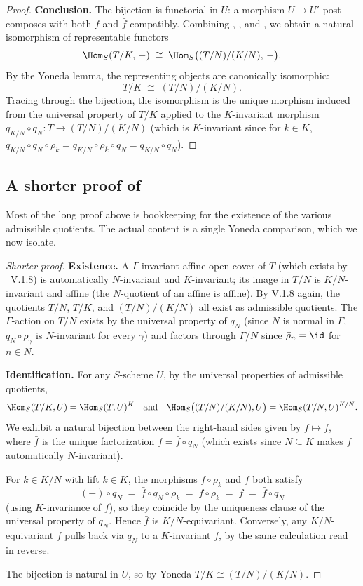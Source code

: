 \begin{proof}
\textbf{Conclusion.} The bijection  is functorial in $U$: a morphism $U \to U'$ post-composes with both $f$ and $\bar f$ compatibly. Combining , , and , we obtain a natural isomorphism of representable functors
\[
\Hom_S(T/K,\, -) \;\cong\; \Hom_S\bigl((T/N)/(K/N),\, -\bigr).
\]
By the Yoneda lemma, the representing objects are canonically isomorphic:
\[
T/K \;\cong\; (T/N)/(K/N).
\]
Tracing through the bijection, the isomorphism is the unique morphism induced from the universal property of $T/K$ applied to the $K$-invariant morphism $q_{K/N} \circ q_N : T \to (T/N)/(K/N)$ (which is $K$-invariant since for $k \in K$, $q_{K/N} \circ q_N \circ \rho_k = q_{K/N} \circ \bar\rho_{\bar k} \circ q_N = q_{K/N} \circ q_N$).
\end{proof}

\subsection*{A shorter proof of }

Most of the long proof above is bookkeeping for the existence of the various admissible quotients. The actual content is a single Yoneda comparison, which we now isolate.

\begin{proof}[Shorter proof]
\textbf{Existence.} A $\Gamma$-invariant affine open cover of $T$ (which exists by \cite{sga1}~V.1.8) is automatically $N$-invariant and $K$-invariant; its image in $T/N$ is $K/N$-invariant and affine (the $N$-quotient of an affine is affine). By V.1.8 again, the quotients $T/N$, $T/K$, and $(T/N)/(K/N)$ all exist as admissible quotients. The $\Gamma$-action on $T/N$ exists by the universal property of $q_N$ (since $N$ is normal in $\Gamma$, $q_N \circ \rho_\gamma$ is $N$-invariant for every $\gamma$) and factors through $\Gamma/N$ since $\bar\rho_n = \id$ for $n \in N$.

\textbf{Identification.} For any $S$-scheme $U$, by the universal properties of admissible quotients,
\[
\Hom_S(T/K,U) = \Hom_S(T,U)^K \quad\text{and}\quad \Hom_S\bigl((T/N)/(K/N),U\bigr) = \Hom_S(T/N,U)^{K/N}.
\]
We exhibit a natural bijection between the right-hand sides given by $f \mapsto \bar f$, where $\bar f$ is the unique factorization $f = \bar f \circ q_N$ (which exists since $N \subseteq K$ makes $f$ automatically $N$-invariant).

For $\bar k \in K/N$ with lift $k \in K$, the morphisms $\bar f \circ \bar\rho_{\bar k}$ and $\bar f$ both satisfy
\[
(-) \circ q_N \;=\; \bar f \circ q_N \circ \rho_k \;=\; f \circ \rho_k \;=\; f \;=\; \bar f \circ q_N
\]
(using $K$-invariance of $f$), so they coincide by the uniqueness clause of the universal property of $q_N$. Hence $\bar f$ is $K/N$-equivariant. Conversely, any $K/N$-equivariant $\bar f$ pulls back via $q_N$ to a $K$-invariant $f$, by the same calculation read in reverse.

The bijection is natural in $U$, so by Yoneda $T/K \cong (T/N)/(K/N)$.
\end{proof}

